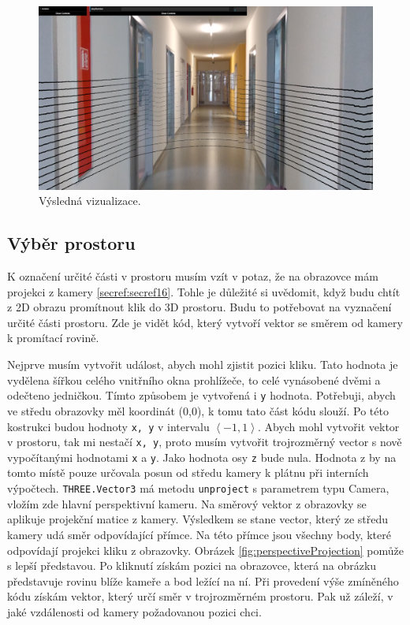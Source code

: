 \documentclass[czech,bachelor,dept420,male,cpdeclaration]{diploma}
\begin{document}
\begin{figure}[H]
\includegraphics[width=\linewidth]{Figures/sceneWithPoints.png}
\caption{Výsledná vizualizace.}
\label{fig:sceneWithPoints}
\end{figure}
	 

\subsection{Výběr prostoru}\label{secref:secref10}
K označení určité části v prostoru musím vzít v potaz, že na obrazovce mám projekci z kamery \ref{secref:secref16}. Tohle je důležité si uvědomit, když budu chtít z 2D obrazu promítnout klik do 3D prostoru. Budu to potřebovat na vyznačení určité části prostoru. Zde je vidět kód, který vytvoří vektor se směrem od kamery k promítací rovině.  



Nejprve musím vytvořit událost, abych mohl zjistit pozici kliku. Tato hodnota je vydělena šířkou celého vnitřního okna prohlížeče, to celé vynásobené dvěmi a odečteno jedničkou. Tímto způsobem je vytvořená i \texttt{y} hodnota. Potřebuji, abych ve středu obrazovky měl koordinát (0,0), k tomu tato část kódu slouží. Po této kostrukci budou hodnoty \texttt{x, y} v intervalu $\left\langle-1,1\right\rangle$. Abych mohl vytvořit vektor v prostoru, tak mi nestačí \texttt{x, y}, proto musím vytvořit trojrozměrný vector s nově vypočítanými hodnotami \texttt{x} a \texttt{y}. Jako hodnota osy \texttt{z} bude nula. Hodnota z by na tomto místě pouze určovala posun od středu kamery k plátnu při interních výpočtech. \texttt{THREE.Vector3} má metodu \texttt{unproject} s parametrem typu Camera, vložím zde hlavní perspektivní kameru. Na směrový vektor z obrazovky se aplikuje projekční matice z kamery. Výsledkem se stane vector, který ze středu kamery udá směr odpovídající přímce. Na této přímce jsou všechny body, které odpovídají projekci kliku z obrazovky. Obrázek \ref{fig:perspectiveProjection}  pomůže s lepší představou. Po kliknutí získám pozici na obrazovce, která na obrázku představuje rovinu blíže kameře a bod ležící na ní. Při provedení výše zmíněného kódu získám vektor, který určí směr v trojrozměrném prostoru. Pak už záleží, v jaké vzdálenosti od kamery požadovanou pozici chci.
\end{document}
